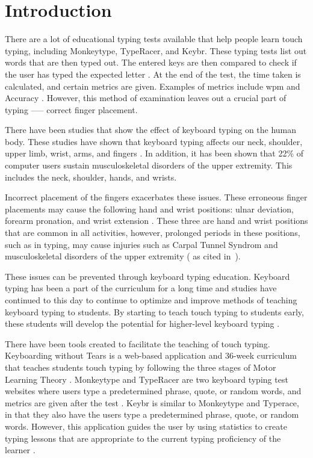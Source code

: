 \documentclass[preprint,12pt,authoryear]{elsarticle}
\begin{document}
\section{Introduction}
There are a lot of educational typing tests available that help people learn
touch typing, including Monkeytype, TypeRacer, and Keybr. These typing tests
list out words that are then typed out. The entered keys are then compared to
check if the user has typed the expected letter \citep{bartnik2021}. At the end
of the test, the time taken is calculated, and certain metrics are given.
Examples of metrics include \ac{wpm} and Accuracy \citep{arif2009}. However,
this method of examination leaves out a crucial part of typing --— correct
finger placement.

There have been studies that show the effect of keyboard typing on the human
body. These studies have shown that keyboard typing affects our neck, shoulder,
upper limb, wrist, arms, and fingers \citep{szeto2005, baker2007digit}. In
addition, it has been shown that 22\% of computer users sustain musculoskeletal
disorders of the upper extremity. This includes the neck, shoulder, hands, and
wrists. \citep{gerr2002}

Incorrect placement of the fingers exacerbates these issues. These erroneous
finger placements may cause the following hand and wrist positions: ulnar
deviation, forearm pronation, and wrist extension \citep{serina1999}. These
three are hand and wrist positions that are common in all activities, however,
prolonged periods in these positions, such as in typing, may cause injuries such
as Carpal Tunnel Syndrom \citep{toosi2015} and musculoskeletal disorders of the
upper extremity (\citet{marklin1999} as cited in~\citet{baker2007}).

These issues can be prevented through keyboard typing education. Keyboard typing
has been a part of the curriculum for a long time \citep{hoot1986} and studies
have continued to this day to continue to optimize and improve methods of
teaching keyboard typing to students. By starting to teach touch typing to
students early, these students will develop the potential for higher-level
keyboard typing \citep{donica2018}.

There have been tools created to facilitate the teaching of touch typing.
Keyboarding without Tears is a web-based application and 36-week curriculum that
teaches students touch typing by following the three stages of Motor Learning
Theory \citep{kwt}. Monkeytype and TypeRacer are two keyboard typing test
websites where users type a predetermined phrase, quote, or random words, and
metrics are given after the test \citep{bartnik2021, typeracer}. Keybr is
similar to Monkeytype and Typerace, in that they also have the users type a
predetermined phrase, quote, or random words. However, this application guides
the user by using statistics to create typing lessons that are appropriate to
the current typing proficiency of the learner \citep{keybr}.
\end{document}
